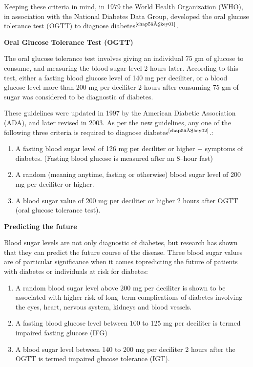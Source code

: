 Keeping these criteria in mind, in 1979 the World Health Organi\-zation (WHO), in association with the National Diabetes Data Group, developed the oral glucose tolerance test (OGTT) to diagnose diabetes$^{\text{\cite{chap5–key01}}}$.

\noindent
\textbf{Oral Glucose Tolerance Test (OGTT)}

The oral glucose tolerance test involves giving an individual 75 gm of glucose to consume, and measuring the blood sugar level 2 hours later. According to this test, either a fasting blood glucose level of 140 mg per deciliter, or a blood glucose level more than 200 mg per deciliter 2 hours after consuming 75 gm of sugar was considered to be diagnostic of diabetes.

These guidelines were updated in 1997 by the American Diabetic Association (ADA), and later revised in 2003. As per the new guidelines, any one of the following three criteria is required to diagnose diabetes$^{\text{\cite{chap5–key02}}}$.:

\begin{enumerate}
\itemsep=0pt
\item A fasting blood sugar level of 126 mg per deciliter or higher + symptoms of diabetes. (Fasting blood glucose is measured after an 8–hour fast)
\item A random (meaning anytime, fasting or otherwise) blood sugar level of 200 mg per deciliter or higher.
\item A blood sugar value of 200 mg per deciliter or higher 2 hours after OGTT (oral glucose tolerance test).
 \end{enumerate}

\noindent
\textbf{Predicting the future}

Blood sugar levels are not only diagnostic of diabetes, but research has shown that they can predict the future course of the disease. Three blood sugar values are of particular significance when it comes to\break predicting the future of patients with diabetes or individuals at risk for diabetes:

\begin{enumerate}
\itemsep=0pt
\item A random blood sugar level above 200 mg per deciliter is shown to be associated with higher risk of long–term complications of diabetes involving the eyes, heart, nervous system, kidneys and blood vessels.
 \item A fasting blood glucose level between 100 to 125 mg per deciliter is termed impaired fasting glucose (IFG)
 \item A blood sugar level between 140 to 200 mg per deciliter 2 hours after the OGTT is termed impaired glucose tolerance (IGT).
 \end{enumerate}


